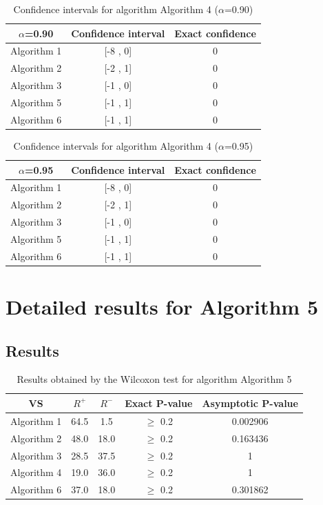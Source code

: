 \documentclass[a4paper,10pt]{article}
\begin{document}
\begin{table}[!htp]
\centering\small
\begin{tabular}{
|c|c|c|}
\hline
 $\alpha$=0.90 & Confidence interval & Exact confidence \\ \hline 
Algorithm 1 & [-8 , 0] & 0\\ \hline 
Algorithm 2 & [-2 , 1] & 0\\ \hline 
Algorithm 3 & [-1 , 0] & 0\\ \hline 
Algorithm 5 & [-1 , 1] & 0\\ \hline 
Algorithm 6 & [-1 , 1] & 0\\ \hline 

\end{tabular}
\caption{Confidence intervals for algorithm Algorithm 4 ($\alpha$=0.90)}
\end{table}
\begin{table}[!htp]
\centering\small
\begin{tabular}{
|c|c|c|}
\hline
 $\alpha$=0.95 & Confidence interval & Exact confidence \\ \hline 
Algorithm 1 & [-8 , 0] & 0\\ \hline 
Algorithm 2 & [-2 , 1] & 0\\ \hline 
Algorithm 3 & [-1 , 0] & 0\\ \hline 
Algorithm 5 & [-1 , 1] & 0\\ \hline 
Algorithm 6 & [-1 , 1] & 0\\ \hline 

\end{tabular}
\caption{Confidence intervals for algorithm Algorithm 4 ($\alpha$=0.95)}
\end{table}

 \clearpage 


\section{Detailed results for Algorithm 5}


\subsection{Results}

\begin{table}[!htp]
\centering\small
\begin{tabular}{
|c|c|c|c|c|}
\hline
 VS & $R^{+}$ & $R^{-}$ & Exact P-value & Asymptotic P-value \\ \hline 
Algorithm 1 & 64.5 & 1.5 & $\geq$ 0.2 & 0.002906\\ \hline 
Algorithm 2 & 48.0 & 18.0 & $\geq$ 0.2 & 0.163436\\ \hline 
Algorithm 3 & 28.5 & 37.5 & $\geq$ 0.2 & 1\\ \hline 
Algorithm 4 & 19.0 & 36.0 & $\geq$ 0.2 & 1\\ \hline 
Algorithm 6 & 37.0 & 18.0 & $\geq$ 0.2 & 0.301862\\ \hline 

\end{tabular}
\caption{Results obtained by the Wilcoxon test for algorithm Algorithm 5}
\end{table}
\end{document}
